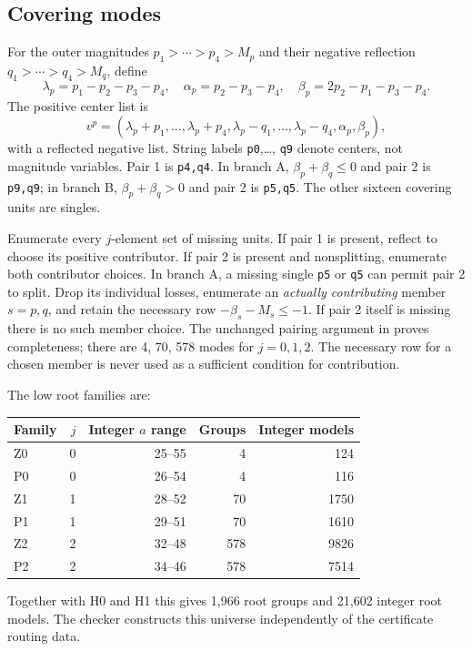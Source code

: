 \documentclass[11pt,a4paper]{article}
\begin{document}
\subsection{Covering modes}
For the outer magnitudes $p_1>\cdots>p_4>M_p$ and their negative
reflection $q_1>\cdots>q_4>M_q$, define
\[
 \lambda_p=p_1-p_2-p_3-p_4,\quad
 \alpha_p=p_2-p_3-p_4,\quad\beta_p=2p_2-p_1-p_3-p_4.
\]
The positive center list is
\[
 v^p=(\lambda_p+p_1,\ldots,\lambda_p+p_4,
       \lambda_p-q_1,\ldots,\lambda_p-q_4,\alpha_p,\beta_p),
\]
with a reflected negative list. String labels \texttt{p0},\ldots,
\texttt{q9} denote centers, not magnitude variables.
Pair 1 is \texttt{p4,q4}. In branch A, $\beta_p+\beta_q\le0$ and
pair 2 is \texttt{p9,q9}; in branch B, $\beta_p+\beta_q>0$ and pair 2
is \texttt{p5,q5}. The other sixteen covering units are singles.

Enumerate every $j$-element set of missing units. If pair 1 is present,
reflect to choose its positive contributor. If pair 2 is present and
nonsplitting, enumerate both contributor choices. In branch A, a missing
single \texttt{p5} or \texttt{q5} can permit pair 2 to split. Drop its
individual losses, enumerate an \emph{actually contributing} member
$s=p,q$, and retain the necessary row $-\beta_s-M_s\le-1$.
If pair 2 itself is missing there is no such member choice.
The unchanged pairing argument in \cite{previous} proves completeness;
there are 4, 70, 578 modes for $j=0,1,2$.
The necessary row for a chosen member is never used as a sufficient
condition for contribution.

The low root families are:
\begin{center}\small
\begin{tabular}{lrrrr}
\toprule
Family&$j$&Integer $a$ range&Groups&Integer models\\
\midrule
Z0&0&25--55&4&124\\
P0&0&26--54&4&116\\
Z1&1&28--52&70&1750\\
P1&1&29--51&70&1610\\
Z2&2&32--48&578&9826\\
P2&2&34--46&578&7514\\
\bottomrule
\end{tabular}
\end{center}
Together with H0 and H1 this gives 1,966 root groups and 21,602 integer
root models. The checker constructs this universe independently of the
certificate routing data.
\end{document}
